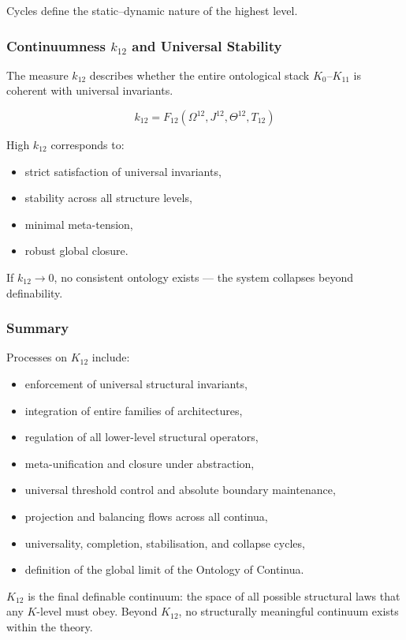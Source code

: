 Cycles define the static–dynamic nature of the highest level.

\subsubsection{Continuumness $k_{12}$ and Universal Stability}

The measure $k_{12}$ describes whether
the entire ontological stack $K_0$--$K_{11}$ 
is coherent with universal invariants.

\[
k_{12} = F_{12}(\Omega^{12}, J^{12}, \Theta^{12}, T_{12})
\]

High $k_{12}$ corresponds to:
\begin{itemize}
    \item strict satisfaction of universal invariants,
    \item stability across all structure levels,
    \item minimal meta-tension,
    \item robust global closure.
\end{itemize}

If $k_{12} \to 0$,  
no consistent ontology exists — the system collapses beyond definability.

\subsubsection{Summary}

Processes on $K_{12}$ include:
\begin{itemize}
    \item enforcement of universal structural invariants,
    \item integration of entire families of architectures,
    \item regulation of all lower-level structural operators,
    \item meta-unification and closure under abstraction,
    \item universal threshold control and absolute boundary maintenance,
    \item projection and balancing flows across all continua,
    \item universality, completion, stabilisation, and collapse cycles,
    \item definition of the global limit of the Ontology of Continua.
\end{itemize}

$K_{12}$ is the final definable continuum:  
the space of all possible structural laws that any $K$-level must obey.  
Beyond $K_{12}$, no structurally meaningful continuum exists within the theory.
